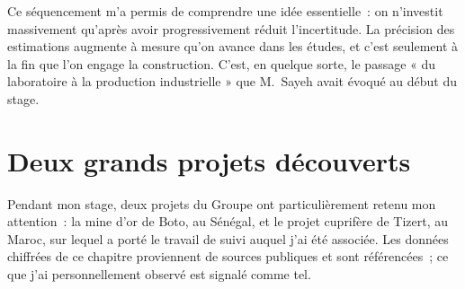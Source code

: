 \documentclass[12pt,a4paper,oneside]{report}
\begin{document}
\begin{center}
\label{fig:maturation}
\end{center}

Ce séquencement m'a permis de comprendre une idée essentielle~: on n'investit massivement qu'après avoir progressivement réduit l'incertitude. La précision des estimations augmente à mesure qu'on avance dans les études, et c'est seulement à la fin que l'on engage la construction. C'est, en quelque sorte, le passage « du laboratoire à la production industrielle » que M.~Sayeh avait évoqué au début du stage.
\chapter{Deux grands projets découverts}
\label{chap:projets}

Pendant mon stage, deux projets du Groupe ont particulièrement retenu mon attention~: la mine d'or de Boto, au Sénégal, et le projet cuprifère de Tizert, au Maroc, sur lequel a porté le travail de suivi auquel j'ai été associée. Les données chiffrées de ce chapitre proviennent de sources publiques et sont référencées~; ce que j'ai personnellement observé est signalé comme tel.
\end{document}
